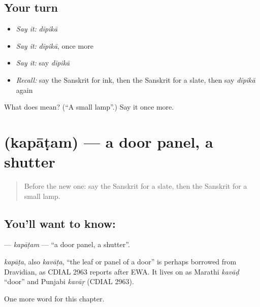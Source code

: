 \subsection*{Your turn}
\begin{itemize}
\raggedright
  \item \emph{Say it:} \emph{dīpikā}
  \item \emph{Say it:} \emph{dīpikā}, once more
  \item \emph{Say it:} say \emph{dīpikā}
  \item \emph{Recall:} say the Sanskrit for ink, then the Sanskrit for a slate, then say \emph{dīpikā} again
\end{itemize}

\begin{tcolorbox}[breakable,colback=teal!4,colframe=teal!35!black,title={Before you move on}]
What does  mean? (\textquotedblleft{}A small lamp\textquotedblright{}.) Say it once more.
\end{tcolorbox}
\section[\texorpdfstring{\sk{कपाटम्} (kapāṭam)}{कपाटम् (kapāṭam)}]{ (kapāṭam) — a door panel, a shutter}

\label{lesson:SA-C158-kapatam}



\begin{quote}
Before the new one: say the Sanskrit for a slate, then the Sanskrit for a small lamp.
\end{quote}

\subsection*{You'll want to know: }
\textbf{} — \emph{kapāṭam} — \textquotedblleft{}a door panel, a shutter\textquotedblright{}.

\begin{cousinweb}
\emph{kapāṭa}, also \emph{kavāṭa}, \textquotedblleft{}the leaf or panel of a door\textquotedblright{} is perhaps borrowed from Dravidian, as CDIAL 2963 reports after EWA. It lives on as Marathi \emph{kavāḍ} \textquotedblleft{}door\textquotedblright{} and Punjabi \emph{kavāṛ} (CDIAL 2963).
\end{cousinweb}

\begin{grammarlens}[title={What you've built}]
One more word for this chapter.
\end{grammarlens}

